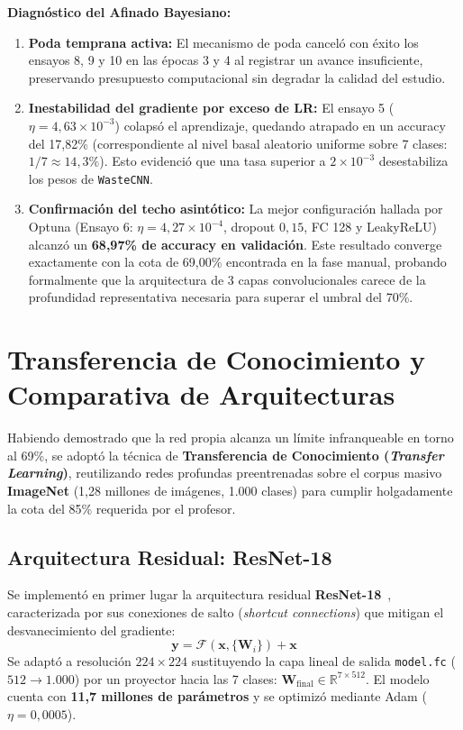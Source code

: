 \documentclass[11pt,a4paper]{article}
\begin{document}
\textbf{Diagnóstico del Afinado Bayesiano:}
\begin{enumerate}[noitemsep]
    \item \textbf{Poda temprana activa:} El mecanismo de poda canceló con éxito los ensayos 8, 9 y 10 en las épocas 3 y 4 al registrar un avance insuficiente, preservando presupuesto computacional sin degradar la calidad del estudio.
    \item \textbf{Inestabilidad del gradiente por exceso de LR:} El ensayo 5 ($\eta = 4,63 \times 10^{-3}$) colapsó el aprendizaje, quedando atrapado en un accuracy del 17,82\% (correspondiente al nivel basal aleatorio uniforme sobre 7 clases: $1/7 \approx 14,3\%$). Esto evidenció que una tasa superior a $2\times 10^{-3}$ desestabiliza los pesos de \texttt{WasteCNN}.
    \item \textbf{Confirmación del techo asintótico:} La mejor configuración hallada por Optuna (Ensayo 6: $\eta = 4,27 \times 10^{-4}$, dropout $0,15$, FC 128 y LeakyReLU) alcanzó un \textbf{68,97\% de accuracy en validación}. Este resultado converge exactamente con la cota de 69,00\% encontrada en la fase manual, probando formalmente que la arquitectura de 3 capas convolucionales carece de la profundidad representativa necesaria para superar el umbral del 70\%.
\end{enumerate}

\FloatBarrier
\section{Transferencia de Conocimiento y Comparativa de Arquitecturas}

Habiendo demostrado que la red propia alcanza un límite infranqueable en torno al 69\%, se adoptó la técnica de \textbf{Transferencia de Conocimiento (\textit{Transfer Learning})}, reutilizando redes profundas preentrenadas sobre el corpus masivo \textbf{ImageNet} (1,28 millones de imágenes, 1.000 clases) para cumplir holgadamente la cota del 85\% requerida por el profesor.

\subsection{Arquitectura Residual: ResNet-18}
Se implementó en primer lugar la arquitectura residual \textbf{ResNet-18}~\cite{he2016deep}, caracterizada por sus conexiones de salto (\textit{shortcut connections}) que mitigan el desvanecimiento del gradiente:
\begin{equation}
    \mathbf{y} = \mathcal{F}(\mathbf{x}, \{\mathbf{W}_i\}) + \mathbf{x}
\end{equation}
Se adaptó a resolución $224\times 224$ sustituyendo la capa lineal de salida \texttt{model.fc} ($512 \to 1.000$) por un proyector hacia las 7 clases: $\mathbf{W}_{\text{final}} \in \mathbb{R}^{7 \times 512}$. El modelo cuenta con \textbf{11,7 millones de parámetros} y se optimizó mediante Adam ($\eta = 0,0005$).
\end{document}
